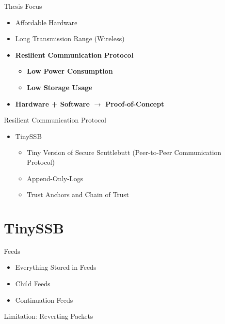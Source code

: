 \documentclass[aspectratio=169]{beamer}
\begin{document}
\begin{frame}[c]{Thesis Focus}
\begin{itemize}
    \item Affordable Hardware
    \item Long Transmission Range (Wireless)
    \item \textbf{Resilient Communication Protocol}
    \begin{itemize}
    	\item \textbf{Low Power Consumption}
    	\item \textbf{Low Storage Usage}
    \end{itemize}
    \item \textbf{Hardware + Software $\rightarrow$ Proof-of-Concept}
\end{itemize}        
\end{frame}

\begin{frame}[c]{Resilient Communication Protocol}
\begin{itemize}
    \item TinySSB
    	\begin{itemize}
	    \item Tiny Version of Secure Scuttlebutt (Peer-to-Peer Communication Protocol) 
    	    \item Append-Only-Logs
    	    \item Trust Anchors and Chain of Trust
	\end{itemize}
\end{itemize}        
\end{frame}

\section{TinySSB}

\begin{frame}[c]{Feeds}
\begin{itemize}
    \item Everything Stored in Feeds
    \item Child Feeds
    \item Continuation Feeds
\end{itemize}        
\end{frame}

\begin{frame}[c]{Limitation: Reverting Packets}
\begin{itemize}
\end{itemize}        
\end{frame}
\end{document}
